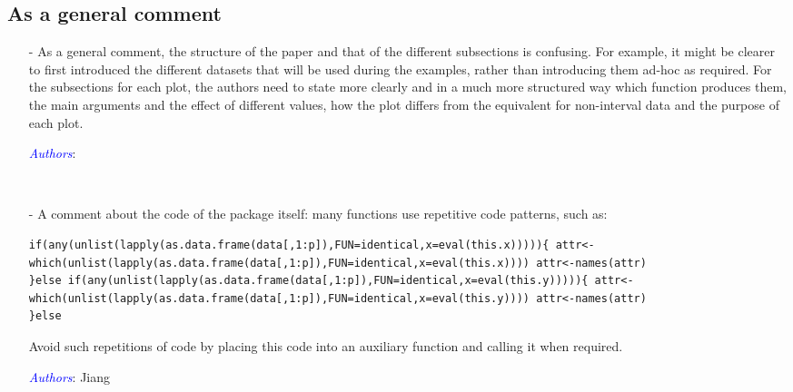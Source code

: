 \documentclass[11pt]{article}
\newcommand{\authors}[1]{

 \parbox{15cm}{\textcolor{blue}{\it Authors}: \color{red}#1}
 \\ \vspace{0.3cm}
}
\begin{document}
\subsection*{As a general comment}
\begin{itemize}
\item[-] As a general comment, the structure of the paper and that of the different subsections is confusing. For example, it might be clearer to first introduced the different datasets that will be used during the examples, rather than introducing them ad-hoc as required. For the subsections for each plot, the authors need to state more clearly and in a much more structured way which function produces them, the main arguments and the effect of different values, how the plot differs from the equivalent for non-interval data and the purpose of each plot. 
\authors{

}


\item[-] 
A comment about the code of the package itself: many functions use repetitive code patterns, such as: 
\begin{verbatim}
if(any(unlist(lapply(as.data.frame(data[,1:p]),FUN=identical,x=eval(this.x))))){ attr<-which(unlist(lapply(as.data.frame(data[,1:p]),FUN=identical,x=eval(this.x)))) attr<-names(attr) 
}else if(any(unlist(lapply(as.data.frame(data[,1:p]),FUN=identical,x=eval(this.y))))){ attr<-which(unlist(lapply(as.data.frame(data[,1:p]),FUN=identical,x=eval(this.y)))) attr<-names(attr) 
}else 
\end{verbatim}
Avoid such repetitions of code by placing this code into an auxiliary function and calling it when required. 
\authors{Jiang

}
\end{itemize}
\end{document}
